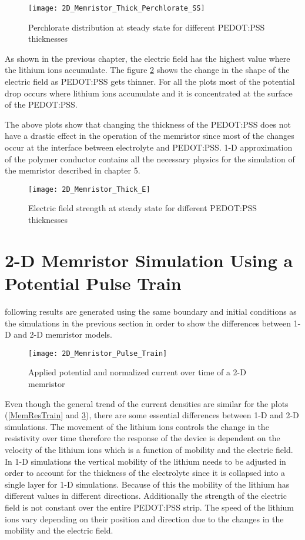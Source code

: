 \begin{doublespace}
\begin{figure}[!htp]
\centering
\texttt{[image: 2D\_Memristor\_Thick\_Perchlorate\_SS]}
\caption{Perchlorate distribution at steady state for different PEDOT:PSS thicknesses} 
\label{thick_perch_ss}
\end{figure}

As shown in the previous chapter, the electric field has the highest value where the lithium ions accumulate. The figure \ref{thick_efield} shows the change in the shape of the electric field as PEDOT:PSS gets thinner. For all the plots most of the potential drop occurs where lithium ions accumulate and it is concentrated at the surface of the PEDOT:PSS. 

The above plots show that changing the thickness of the PEDOT:PSS does not have a drastic effect in the operation of the memristor since most of the changes occur at the interface between electrolyte and PEDOT:PSS.  1-D approximation of the polymer conductor contains all the necessary physics for the simulation of the memristor described in chapter 5.

\begin{figure}[!htp]
\centering
\texttt{[image: 2D\_Memristor\_Thick\_E]}
\caption{Electric field strength at steady state for different PEDOT:PSS thicknesses} 
\label{thick_efield}
\end{figure}


\clearpage
\section{2-D Memristor Simulation Using a Potential Pulse Train}

 following results are generated using the same boundary and initial conditions as the simulations in the previous section in order to show the differences between 1-D and 2-D memristor models.

\begin{figure}[!htp]
\centering
\texttt{[image: 2D\_Memristor\_Pulse\_Train]}
\caption{Applied potential and normalized current over time of a 2-D memristor} 
\label{2D_mem_train}
\end{figure}

 Even though the general trend of the current densities are similar for the plots (\ref{MemResTrain} and \ref{2D_mem_train}), there are some essential differences between 1-D and 2-D simulations. The movement of the lithium ions controls the change in the resistivity over time therefore the response of the device is dependent on the velocity of the lithium ions which is a function of mobility and the electric field. In 1-D simulations the vertical mobility of the lithium needs to be adjusted in order to account for the thickness of the electrolyte since it is collapsed into a single layer for 1-D simulations. Because of this the mobility of the lithium has different values in different directions. Additionally the strength of the electric field is not constant over the entire PEDOT:PSS strip. The speed of the lithium ions vary depending on their position and direction due to the changes in the mobility and the electric field.
 

\end{doublespace}
